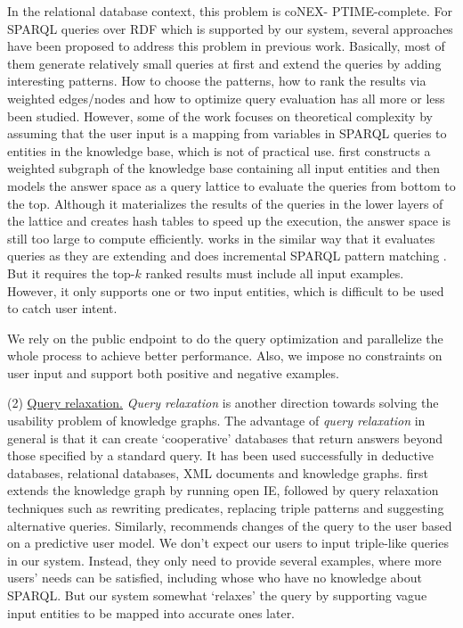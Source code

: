 \documentclass[10pt,conference,letterpaper]{IEEEtran}
\begin{document}
In the relational database context, this problem is coNEX-
PTIME-complete\cite{barcelo2016complexity}. For SPARQL queries over RDF which is supported by our system, several approaches have been proposed to address this problem in previous work\cite{sparqlbye,querybyexample,reversewww,sapphire}. 
Basically, most of them generate relatively small queries at first and extend the queries by adding interesting patterns. How to choose the patterns, how to rank the results via weighted edges/nodes and how to optimize query evaluation has all more or less been studied.
However, some of the work\cite{reversewww,sparqlbye} focuses on theoretical complexity by assuming that 
the user input is a mapping from variables in SPARQL queries to entities in the knowledge base, which is not of practical use.
\cite{querybyexample} first constructs a weighted subgraph of the knowledge base containing all input entities and then models the answer space as a query lattice to evaluate the queries from bottom to the top.
Although it materializes the results of the queries in the lower layers of the lattice and creates hash tables to speed up the execution, the answer space is still too large to compute efficiently. \cite{discovering} works in the similar way that it evaluates queries as they are extending and does incremental SPARQL pattern matching . But it requires the top-$k$ ranked results must include all input examples. However, it only supports one or two input entities, which is difficult to be used to catch user intent. 

We rely on the public endpoint to do the query optimization and parallelize the whole process to achieve better performance. Also, we impose no constraints on user input and support both positive and negative examples.

(2) \underline{Query relaxation.}
\emph{Query relaxation} is another direction towards solving the usability problem of knowledge graphs. The advantage of \emph{query relaxation} in general is that it can create `cooperative' databases that return answers beyond those specified by a standard query. It has been used successfully in deductive databases\cite{deductive_relax}, relational databases\cite{relational_relax}, XML documents\cite{xml_relax} and knowledge graphs\cite{EKG,sapphire}.
\cite{EKG} first extends the knowledge graph by running open IE, followed by query relaxation techniques such as rewriting predicates, replacing triple patterns and suggesting alternative queries. Similarly, \cite{sapphire} recommends changes of the query to the user based on a predictive user model.
We don't expect our users to input triple-like queries in our system. Instead, they only need to provide several examples, where more users' needs can be satisfied, including whose who have no knowledge about SPARQL. But our system somewhat `relaxes' the query by supporting vague input entities to be mapped into accurate ones later.
\end{document}
